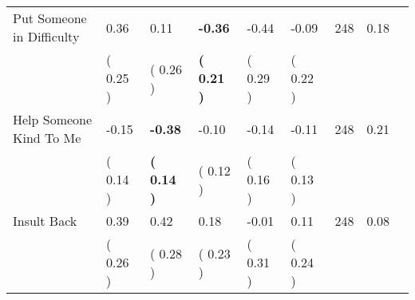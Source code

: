 \begin{tabular}{L{6.2cm} C{1.8cm} C{1.8cm} C{1.8cm} C{1.8cm} C{1.8cm} C{1.8cm} C{0.3cm} C{0.3cm}}
Put Someone in Difficulty &      0.36 &      0.11 & \textbf{    -0.36} &     -0.44 &     -0.09  & 248 &       0.18 \\ 
 & (     0.25 ) & (     0.26 ) & \textbf{(     0.21 )} & (     0.29 ) & (     0.22 )  & \\
Help Someone Kind To Me &     -0.15 & \textbf{    -0.38} &     -0.10 &     -0.14 &     -0.11  & 248 &       0.21 \\ 
 & (     0.14 ) & \textbf{(     0.14 )} & (     0.12 ) & (     0.16 ) & (     0.13 )  & \\
Insult Back &      0.39 &      0.42 &      0.18 &     -0.01 &      0.11  & 248 &       0.08 \\ 
 & (     0.26 ) & (     0.28 ) & (     0.23 ) & (     0.31 ) & (     0.24 )  & \\
\bottomrule
\end{tabular}
